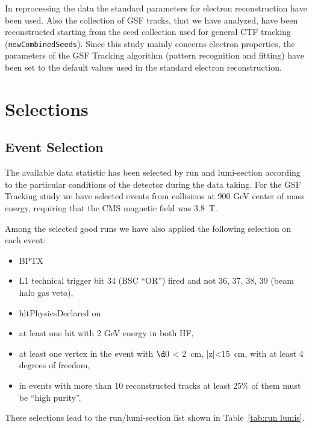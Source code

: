 In reprocessing the data the standard parameters for electron
reconstruction have been used.
Also the collection of GSF tracks, that we have analyzed, have been reconstructed starting from the 
seed collection used for general CTF tracking (\verb=newCombinedSeeds=).
Since this study mainly concerns electron properties, the parameters of the GSF Tracking 
algorithm (pattern recognition and fitting) have been set to the default values used in the 
standard electron reconstruction.

\section{Selections}\label{sec:Selections}

\subsection{Event Selection}
The available data statistic has been selected by run and lumi-section according to the
particular conditions of the detector during the data taking. 
For the GSF Tracking study we have selected events from collisions at 900 GeV
center of mass energy, requiring that the CMS magnetic field was 3.8~T. 

Among the selected good runs we have also applied the following selection on each event:
\begin{itemize}
\item BPTX 
\item L1 technical trigger bit 34 (BSC ``OR'') fired and not 36, 37, 38, 39 (beam halo gas veto),
\item hltPhysicsDeclared on
\item at least one hit with 2 GeV energy in both HF,
\item at least one vertex in the event with $\d0$ < 2~cm, |z|<15~cm, with at least 4 degrees of freedom,
\item in events with more than 10 reconstructed tracks at least 25\%
  of them must be ``high purity''. 
\end{itemize}

These selections lead to the run/lumi-section list shown in Table~\ref{tab:run lumis}.

